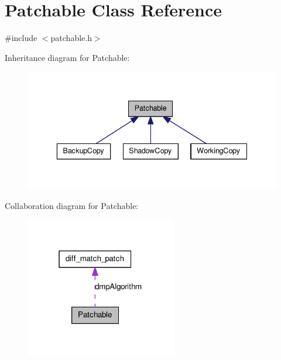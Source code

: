 \hypertarget{class_patchable}{
\section{Patchable Class Reference}
\label{class_patchable}
}


{\ttfamily \#include $<$patchable.h$>$}



Inheritance diagram for Patchable:\nopagebreak
\begin{figure}[H]
\begin{center}
\leavevmode
\includegraphics[width=338pt]{class_patchable__inherit__graph}
\end{center}
\end{figure}


Collaboration diagram for Patchable:\nopagebreak
\begin{figure}[H]
\begin{center}
\leavevmode
\includegraphics[width=187pt]{class_patchable__coll__graph}
\end{center}
\end{figure}
